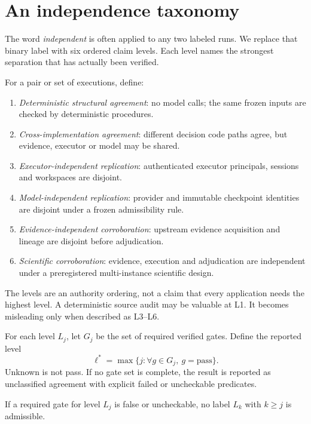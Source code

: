 \section{An independence taxonomy}

The word \emph{independent} is often applied to any two labeled runs. We replace
that binary label with six ordered claim levels. Each level names the strongest
separation that has actually been verified.

\begin{definition}
For a pair or set of executions, define:
\begin{enumerate}[label=\textbf{L\arabic*.}]
  \item \emph{Deterministic structural agreement}: no model calls; the same frozen
        inputs are checked by deterministic procedures.
  \item \emph{Cross-implementation agreement}: different decision code paths
        agree, but evidence, executor or model may be shared.
  \item \emph{Executor-independent replication}: authenticated executor principals,
        sessions and workspaces are disjoint.
  \item \emph{Model-independent replication}: provider and immutable checkpoint
        identities are disjoint under a frozen admissibility rule.
  \item \emph{Evidence-independent corroboration}: upstream evidence acquisition
        and lineage are disjoint before adjudication.
  \item \emph{Scientific corroboration}: evidence, execution and adjudication are
        independent under a preregistered multi-instance scientific design.
\end{enumerate}
\end{definition}

The levels are an authority ordering, not a claim that every application needs the
highest level. A deterministic source audit may be valuable at L1. It becomes
misleading only when described as L3--L6.

For each level $L_j$, let $G_j$ be the set of required verified gates. Define the
reported level
\[
\ell^*=\max\{j:\forall g\in G_j,\ g=\text{pass}\}.
\]
Unknown is not pass. If no gate set is complete, the result is reported as
unclassified agreement with explicit failed or uncheckable predicates.

\begin{proposition}
If a required gate for level $L_j$ is false or uncheckable, no label $L_k$ with
$k\geq j$ is admissible.
\end{proposition}

